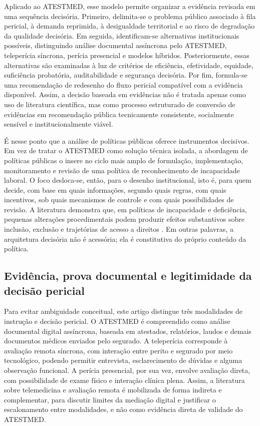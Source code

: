 \documentclass[12pt,a4paper]{article}
\begin{document}
Aplicado ao ATESTMED, esse modelo permite organizar a evidência revisada em uma sequência decisória. Primeiro, delimita-se o problema público associado à fila pericial, à demanda reprimida, à desigualdade territorial e ao risco de degradação da qualidade decisória. Em seguida, identificam-se alternativas institucionais possíveis, distinguindo análise documental assíncrona pelo ATESTMED, teleperícia síncrona, perícia presencial e modelos híbridos. Posteriormente, essas alternativas são examinadas à luz de critérios de eficiência, efetividade, equidade, suficiência probatória, auditabilidade e segurança decisória. Por fim, formula-se uma recomendação de redesenho do fluxo pericial compatível com a evidência disponível. Assim, a decisão baseada em evidências não é tratada apenas como uso de literatura científica, mas como processo estruturado de conversão de evidências em recomendação pública tecnicamente consistente, socialmente sensível e institucionalmente viável.

É nesse ponto que a análise de políticas públicas oferece instrumentos decisivos. Em vez de tratar o ATESTMED como solução técnica isolada, a abordagem de políticas públicas o insere no ciclo mais amplo de formulação, implementação, monitoramento e revisão de uma política de reconhecimento de incapacidade laboral. O foco desloca-se, então, para o desenho institucional, isto é, para quem decide, com base em quais informações, segundo quais regras, com quais incentivos, sob quais mecanismos de controle e com quais possibilidades de revisão. A literatura demonstra que, em políticas de incapacidade e deficiência, pequenas alterações procedimentais podem produzir efeitos substantivos sobre inclusão, exclusão e trajetórias de acesso a direitos \parencite{nogueira20200731t0100000100aavaliacaodadeficiencianatraje,rajasulochana2026doeshavingadisabilitycertificateensurebenefit}. Em outras palavras, a arquitetura decisória não é acessória; ela é constitutiva do próprio conteúdo da política.

\subsection{Evidência, prova documental e legitimidade da decisão pericial}
\label{sec:orgf5c9c44}

Para evitar ambiguidade conceitual, este artigo distingue três modalidades de instrução e decisão pericial. O ATESTMED é compreendido como análise documental digital assíncrona, baseada em atestados, relatórios, laudos e demais documentos médicos enviados pelo segurado. A teleperícia corresponde à avaliação remota síncrona, com interação entre perito e segurado por meio tecnológico, podendo permitir entrevista, esclarecimento de dúvidas e alguma observação funcional. A perícia presencial, por sua vez, envolve avaliação direta, com possibilidade de exame físico e interação clínica plena. Assim, a literatura sobre telemedicina e avaliação remota é mobilizada de forma indireta e complementar, para discutir limites da mediação digital e justificar o escalonamento entre modalidades, e não como evidência direta de validade do ATESTMED.
\end{document}

